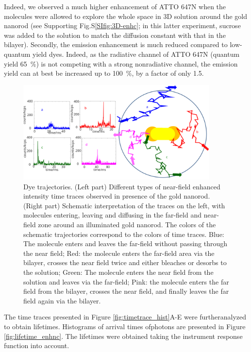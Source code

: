 Indeed, we observed a much higher enhancement of ATTO 647N when the molecules were allowed to explore the whole space in 3D solution around the gold nanorod (see Supporting Fig.S\ref{SIfig:3D-enhc}; in this latter experiment, sucrose was added to the solution to match the diffusion constant with that in the bilayer).
Secondly, the emission enhancement is much reduced compared to low-quantum yield dyes.
Indeed, as the radiative channel of ATTO 647N (quantum yield \SI{65}{\percent}) is not competing with a strong nonradiative channel, the emission yield can at best be increased up to \SI{100}{\percent}, by a factor of only 1.5.\cite{khatua2014resonant}
\begin{figure}
	\centering
	\includegraphics[width=0.9\textwidth]{enhnc_trajectories}
	\caption{Dye trajectories. (Left part) Different types of near-field enhanced intensity time traces observed in presence of the gold nanorod.
	(Right part) Schematic interpretation of the traces on the left, with molecules entering, leaving and diffusing in the far-field and near-field zone around an illuminated gold nanorod. 
	The colors of the schematic trajectories correspond to the colors of time traces.
	Blue: The molecule enters and leaves the far-field without passing through the near field; Red: the molecule enters the far-field area via the bilayer, crosses the near field twice and either bleaches or desorbs to the solution; Green: The molecule enters the near field from the solution and leaves via the far-field; Pink: the molecule enters the far field from the bilayer, crosses the near field, and finally leaves the far field again via the bilayer.}
	\label{fig:enhnc_trajectories}
\end{figure}
The time traces presented in Figure \ref{fig:timetrace_hist}A-E were furtheranalyzed to obtain lifetimes. 
Histograms of arrival times ofphotons are presented in Figure \ref{fig:lifetime_enhnc}.
The lifetimes were obtained taking the instrument response function into account.

